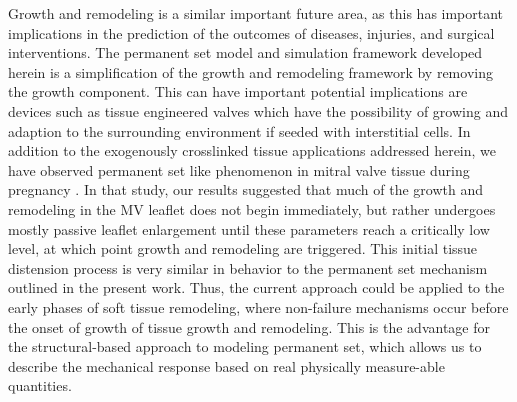     
    Growth and remodeling is a similar important future area, as this has important implications in the prediction of the outcomes of diseases, injuries, and surgical interventions. The permanent set model and simulation framework developed herein is a simplification of the growth and remodeling framework by removing the growth component. This can have important potential implications are devices such as tissue engineered valves which have the possibility of growing and adaption to the surrounding environment if seeded with interstitial cells. In addition to the exogenously crosslinked tissue applications addressed herein, we have observed permanent set like phenomenon in mitral valve tissue during pregnancy \cite{rego_mitral_2016}. In that study, our results suggested that much of the growth and remodeling in the MV leaflet does not begin immediately, but rather undergoes mostly passive leaflet enlargement until these parameters reach a critically low level, at which point growth and remodeling are triggered. This initial tissue distension process is very similar in behavior to the permanent set mechanism outlined in the present work. Thus, the current approach could be applied to the early phases of soft tissue remodeling, where non-failure mechanisms occur before the onset of growth of tissue growth and remodeling. This is the advantage for the structural-based approach to modeling permanent set, which allows us to describe the mechanical response based on real physically measure-able quantities. 
    

\newpage


    
 